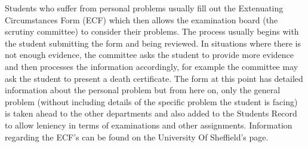 \documentclass[../main.tex]{subfiles}
\begin{document}
\raggedright

Students who suffer from personal problems usually fill out the Extenuating Circumstances Form (ECF) which then allows the examination board (the
scrutiny committee) to consider their problems. The process usually begins
with the student submitting the form and being reviewed. In situations where
there is not enough evidence, the committee asks the student to provide more
evidence and then processes the information accordingly, for example the committee may ask the student to present a death certificate. The form at this point has detailed information about the personal problem but from here on, only the general problem (without including details of the specific problem the student is facing) is taken ahead to the other departments and also added to the Students Record to allow leniency in terms of examinations and other assignments. Information regarding the ECF's can be found on the University
Of Sheffield's page.\cite{ecfuni}
\end{document}
